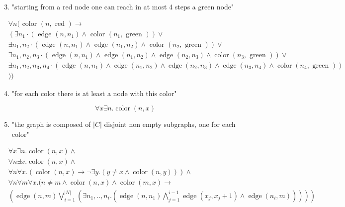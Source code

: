 \documentclass[10pt]{article}
\begin{document}
\begin{enumerate}
  \setcounter{enumi}{2}
  \item "starting from a red node one can reach in at most 4 steps a green node"
\end{enumerate}

$$
\begin{aligned}
& \forall n(\text { color }(n, \text { red }) \rightarrow \\
& \left(\exists n_{1} \cdot\left(\text { edge }\left(n, n_{1}\right) \wedge \text { color }\left(n_{1}, \text { green }\right)\right) \vee\right. \\
& \exists n_{1}, n_{2} \cdot\left(\text { edge }\left(n, n_{1}\right) \wedge \text { edge }\left(n_{1}, n_{2}\right) \wedge \text { color }\left(n_{2}, \text { green }\right)\right) \vee \\
& \exists n_{1}, n_{2}, n_{3} \cdot\left(\text { edge }\left(n, n_{1}\right) \wedge \text { edge }\left(n_{1}, n_{2}\right) \wedge \text { edge }\left(n_{2}, n_{3}\right) \wedge \operatorname{color}\left(n_{3}, \text { green }\right)\right) \vee \\
& \exists n_{1}, n_{2}, n_{3}, n_{4} \cdot\left(\text { edge }\left(n, n_{1}\right) \wedge \operatorname{edge}\left(n_{1}, n_{2}\right) \wedge \operatorname{edge}\left(n_{2}, n_{3}\right) \wedge \operatorname{edge}\left(n_{3}, n_{4}\right) \wedge \operatorname{color}\left(n_{4}, \text { green }\right)\right) \\
& ))
\end{aligned}
$$

\begin{enumerate}
  \setcounter{enumi}{3}
  \item "for each color there is at least a node with this color"
\end{enumerate}

$$
\forall x \exists n . \operatorname{color}(n, x)
$$

\begin{enumerate}
  \setcounter{enumi}{4}
  \item "the graph is composed of $|C|$ disjoint non empty subgraphs, one for each color"
\end{enumerate}

$$
\begin{aligned}
& \forall x \exists n . \operatorname{color}(n, x) \wedge \\
& \forall n \exists x . \operatorname{color}(n, x) \wedge \\
& \forall n \forall x .(\operatorname{color}(n, x) \rightarrow \neg \exists y .(y \neq x \wedge \operatorname{color}(n, y))) \wedge \\
& \forall n \forall m \forall x .(n \neq m \wedge \operatorname{color}(n, x) \wedge \operatorname{color}(m, x) \rightarrow \\
& \left.\left(\operatorname{edge}(n, m) \bigvee_{i=1}^{|N|}\left(\exists n_{1}, . ., n_{i} .\left(\operatorname{edge}\left(n, n_{1}\right) \bigwedge_{j=1}^{i-1} \operatorname{edge}\left(x_{j}, x_{j}+1\right) \wedge \operatorname{edge}\left(n_{i}, m\right)\right)\right)\right)\right)
\end{aligned}
$$
\end{document}
